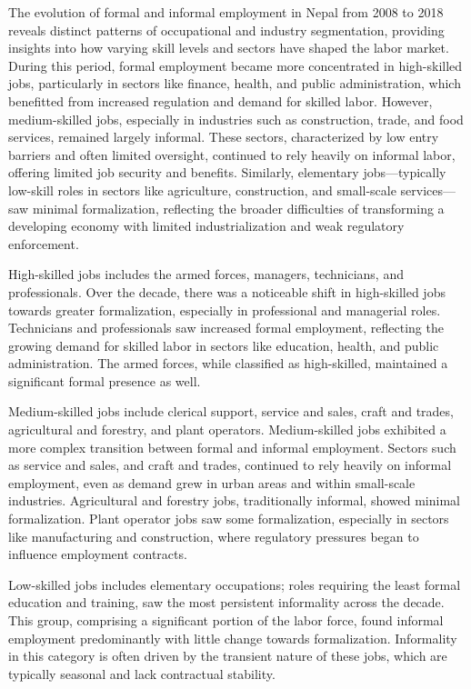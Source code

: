The evolution of formal and informal employment in Nepal from 2008 to 2018 reveals distinct patterns of occupational and industry segmentation, providing insights into how varying skill levels and sectors have shaped the labor market. During this period, formal employment became more concentrated in high-skilled jobs, particularly in sectors like finance, health, and public administration, which benefitted from increased regulation and demand for skilled labor. However, medium-skilled jobs, especially in industries such as construction, trade, and food services, remained largely informal. These sectors, characterized by low entry barriers and often limited oversight, continued to rely heavily on informal labor, offering limited job security and benefits. Similarly, elementary jobs—typically low-skill roles in sectors like agriculture, construction, and small-scale services—saw minimal formalization, reflecting the broader difficulties of transforming a developing economy with limited industrialization and weak regulatory enforcement.

High-skilled jobs includes the armed forces, managers, technicians, and professionals. Over the decade, there was a noticeable shift in high-skilled jobs towards greater formalization, especially in professional and managerial roles. Technicians and professionals saw increased formal employment, reflecting the growing demand for skilled labor in sectors like education, health, and public administration. The armed forces, while classified as high-skilled, maintained a significant formal presence as well.

Medium-skilled jobs include clerical support, service and sales, craft and trades, agricultural and forestry, and plant operators. Medium-skilled jobs exhibited a more complex transition between formal and informal employment. Sectors such as service and sales, and craft and trades, continued to rely heavily on informal employment, even as demand grew in urban areas and within small-scale industries. Agricultural and forestry jobs, traditionally informal, showed minimal formalization. Plant operator jobs saw some formalization, especially in sectors like manufacturing and construction, where regulatory pressures began to influence employment contracts. 

Low-skilled jobs includes elementary occupations; roles requiring the least formal education and training, saw the most persistent informality across the decade. This group, comprising a significant portion of the labor force, found informal employment predominantly with little change towards formalization. Informality in this category is often driven by the transient nature of these jobs, which are typically seasonal and lack contractual stability.




